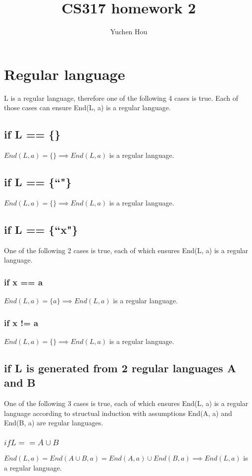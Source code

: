 \documentclass{article}
\begin{document}
\lstset{language=Java}
\title{CS317 homework 2}
\author{Yuchen Hou}
\maketitle

\section{Regular language}
L is a regular language, therefore one of the following 4 cases is true. Each of
those cases can ensure End(L, a) is a regular language.

\subsection{if L == \{\}}
$End(L, a) = \{\} \implies End(L, a)$ is a regular language.

\subsection{if L == \{``"\}}
$End(L, a) = \{\} \implies End(L, a)$ is a regular language.

\subsection{if L == \{``x"\}}
One of the following 2 cases is true, each of which ensures End(L, a) is a
regular language.

\subsubsection{if x == a}
$End(L, a) = \{a\} \implies End(L, a)$ is a regular language.

\subsubsection{if x != a}
$End(L, a) = \{\} \implies End(L, a)$ is a regular language.

\subsection{if L is generated from 2 regular languages A and B}
One of the following 3 cases is true, each of which ensures End(L, a) is a
regular language according to structual induction with assumptions End(A, a) and
End(B, a) are regular languages.

\subsubsection{$if L == A \cup B$}
$End(L, a) = End(A \cup B, a) = End(A, a) \cup End(B, a) \implies End(L, a)$ is
a regular language.
\end{document}
